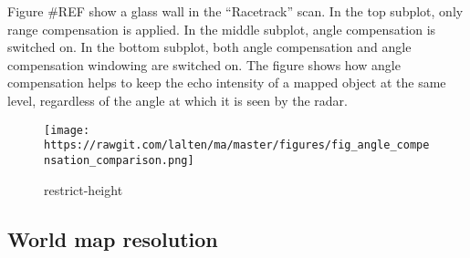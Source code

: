 Figure \#REF show a glass wall in the ``Racetrack'' scan. In the top
subplot, only range compensation is applied. In the middle subplot,
angle compensation is switched on. In the bottom subplot, both angle
compensation and angle compensation windowing are switched on. The
figure shows how angle compensation helps to keep the echo intensity of
a mapped object at the same level, regardless of the angle at which it
is seen by the radar.

\begin{figure}
\centering
\texttt{[image: https://rawgit.com/lalten/ma/master/figures/fig\_angle\_compensation\_comparison.png]}
\caption{restrict-height}
\end{figure}

\subsection{World map resolution}\label{world-map-resolution}
